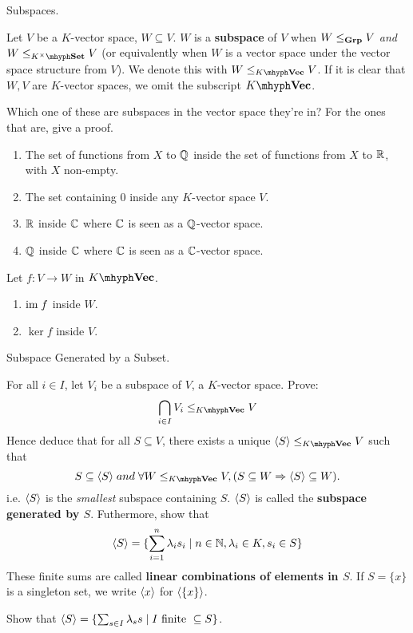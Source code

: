 \documentclass[../../book.tex]{subfiles}
\begin{document}
\begin{dfn} Subspaces. 

    Let $V$ be a $K$-vector space, $W \subseteq V$.
    $W$ is a \textbf{subspace} of $V$ when 
    $W \leq_{\mathbf{Grp}} V$ \emph{and} $W \leq_{K^\times\mhyph\Set} V$
    (or equivalently when $W$ is a vector space
    under the vector space structure from $V$).
    We denote this with $W \leq_{\KVec} V$. 
    If it is clear that $W, V$ are $K$-vector spaces,
    we omit the subscript $\KVec$. 
    
\end{dfn}
\begin{ex}

    Which one of these are subspaces in the vector space they're in?
    For the ones that are, give a proof. 
    \begin{enumerate}
        \item The set of functions from $X$ to $\mathbb{Q}$ inside 
        the set of functions from $X$ to $\mathbb{R}$, with $X$ non-empty. 
        \item The set containing $0$ inside any $K$-vector space $V$. 
        \item $\mathbb{R}$ inside $\mathbb{C}$ where $\mathbb{C}$ is seen as a $\mathbb{Q}$-vector space.
        \item $\mathbb{Q}$ inside $\mathbb{C}$ where $\mathbb{C}$ is seen as a $\mathbb{C}$-vector space.
    \end{enumerate}
    Let $f : V \to W$ in $\KVec$.
    \begin{enumerate} [resume]
        \item $\textnormal{im}\; f$ inside $W$.
        \item $\ker f$ inside $V$.
    \end{enumerate}

\end{ex}
\begin{ex} Subspace Generated by a Subset. 

    For all $i \in I$, let $V_i$ be a subspace of $V$, a $K$-vector space. 
    Prove: 
    \[\bigcap_{i \in I} V_i \leq_{\KVec} V\] 
    Hence deduce that for all $S \subseteq V$, there exists a unique $\< S\> \leq_{\KVec} V$ such that
    \[
        S \subseteq \< S \> \;and\;
        \forall W \leq_{\KVec} V, (S \subseteq W \imp \< S \> \subseteq W). 
    \]
    i.e. $\langle S \rangle$ is the \emph{smallest} subspace containing $S$. 
    $\langle S \rangle$ is called the \textbf{subspace generated by $S$}. 
    Futhermore, show that 
    \[\langle S \rangle = \{\sum_{i = 1}^n \lambda_i s_i \mid n \in \mathbb{N}, \lambda_i \in K, s_i \in S\}\]
    These finite sums are called \textbf{linear combinations of elements in $S$}.
    If $S = \{x\}$ is a singleton set, 
    we write $\langle x \rangle$ for $\langle \{x\} \rangle$. 
    
    Show that $\langle S\rangle = \{\sum_{s\in I} \lambda_s s \mid I \text{ finite }\subseteq S \}$.
\end{ex}
\end{document}
